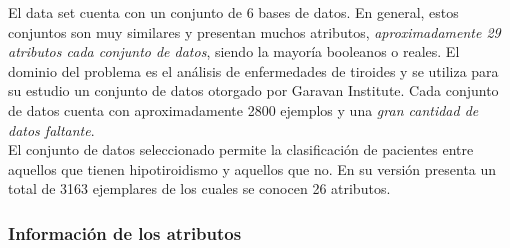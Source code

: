 \documentclass[osajnl,twocolumn,showpacs,superscriptaddress,10pt,floatfix]{revtex4-1} %
\begin{document}
El data set cuenta con un conjunto de 6 bases de datos. En general, estos conjuntos son muy similares y presentan muchos atributos, \textit{aproximadamente 29 atributos cada conjunto de datos}, siendo la mayoría booleanos o reales. El dominio del problema es el análisis de enfermedades de tiroides y se utiliza para su estudio un conjunto de datos otorgado por Garavan Institute. Cada conjunto de datos cuenta con aproximadamente 2800 ejemplos y una \textit{gran cantidad de datos faltante}. \\

El conjunto de datos seleccionado permite la clasificación de pacientes entre aquellos que tienen hipotiroidismo y aquellos que no. En su versión presenta un total de 3163 ejemplares de los cuales se conocen 26 atributos. \\

\subsubsection{Información de los atributos}
\end{document}
